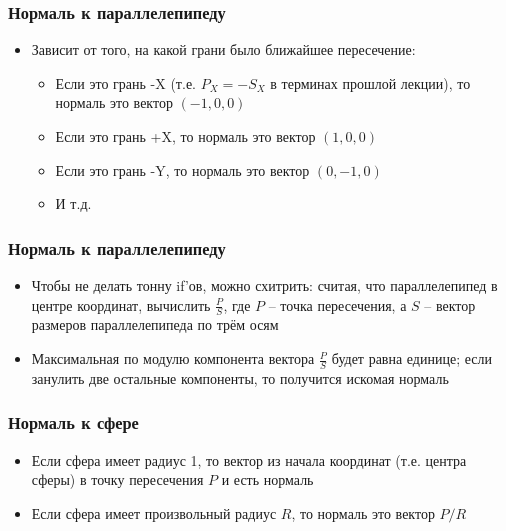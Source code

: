 \documentclass[10pt,handout]{beamer}
\begin{document}
\begin{frame}[fragile]
\frametitle{Нормаль к параллелепипеду}
\begin{itemize}
\item Зависит от того, на какой грани было ближайшее пересечение:
\pause
\begin{itemize}
\item Если это грань -X (т.е. \begin{math}P_X = -S_X\end{math} в терминах прошлой лекции), то нормаль это вектор \begin{math}(-1, 0, 0)\end{math}
\item Если это грань +X, то нормаль это вектор \begin{math}(1, 0, 0)\end{math}
\item Если это грань -Y, то нормаль это вектор \begin{math}(0, -1, 0)\end{math}
\item И т.д.
\end{itemize}
\end{itemize}
\end{frame}

\begin{frame}[fragile]
\frametitle{Нормаль к параллелепипеду}
\begin{itemize}
\item Чтобы не делать тонну if'ов, можно схитрить: считая, что параллелепипед в центре координат, вычислить \begin{math}\frac{P}{S}\end{math}, где \begin{math}P\end{math} -- точка пересечения, а \begin{math}S\end{math} -- вектор размеров параллелепипеда по трём осям
\pause
\item Максимальная по модулю компонента вектора \begin{math}\frac{P}{S}\end{math} будет равна единице; если занулить две остальные компоненты, то получится искомая нормаль
\end{itemize}
\end{frame}

\begin{frame}[fragile]
\frametitle{Нормаль к сфере}
\begin{itemize}
\item Если сфера имеет радиус 1, то вектор из начала координат (т.е. центра сферы) в точку пересечения \begin{math}P\end{math} и есть нормаль
\pause
\item Если сфера имеет произвольный радиус \begin{math}R\end{math}, то нормаль это вектор \begin{math}P/R\end{math}
\end{itemize}
\end{frame}
\end{document}
